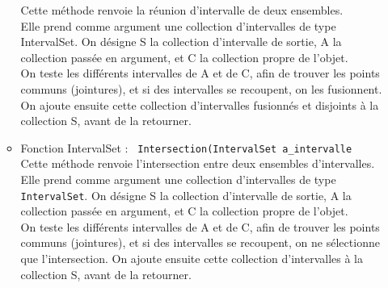 \documentclass[a4paper,french,10pt,twoside]{article}
\begin{document}
\begin{itemize}
\begin{itemize}
			Cette méthode renvoie la réunion d'intervalle de deux ensembles.\\
			Elle prend comme argument une collection d'intervalles de type IntervalSet.
			On désigne S la collection d'intervalle de sortie, A la collection passée en argument, et C la collection propre de l'objet.\\
			On teste les différents intervalles de A et de C, afin de trouver les points communs (jointures), et si des intervalles se recoupent,
			on les fusionnent. On ajoute ensuite cette collection d'intervalles fusionnés et disjoints à la collection S, avant de la retourner.
		\item{Fonction IntervalSet : \verb! Intersection(IntervalSet a_intervalle!}\\
			Cette méthode renvoie l'intersection entre deux ensembles d'intervalles.\\
			Elle prend comme argument une collection d'intervalles de type \verb!IntervalSet!.
			On désigne S la collection d'intervalle de sortie, A la collection passée en argument, et C la collection propre de l'objet.\\
			On teste les différents intervalles de A et de C, afin de trouver les points communs (jointures), et si des intervalles se recoupent,
			on ne sélectionne que l'intersection. On ajoute ensuite cette collection d'intervalles à la collection S, avant de la retourner.
	\end{itemize}
\end{itemize}
\end{document}
